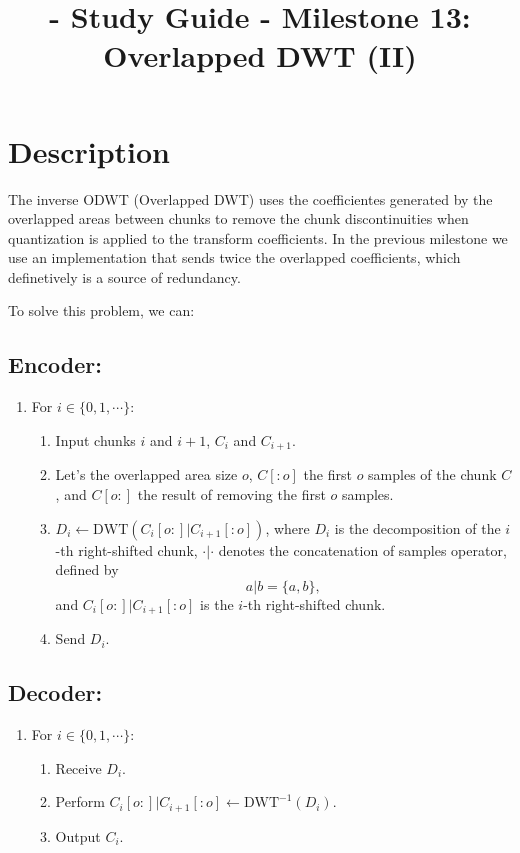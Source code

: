 
\title{\TM{} - Study Guide - Milestone 13: Overlapped DWT (II)}

\maketitle

\section{Description}

The inverse ODWT (Overlapped DWT) uses the coefficientes generated by
the overlapped areas between chunks to remove the chunk
discontinuities when quantization is applied to the transform
coefficients. In the previous milestone we use an implementation that
sends twice the overlapped coefficients, which definetively is a
source of redundancy.

To solve this problem, we can:

\subsection*{Encoder:}
\begin{enumerate}
\item For $i\in\{0,1,\cdots\}$:
  \begin{enumerate}
  \item Input chunks $i$ and $i+1$, $C_i$ and $C_{i+1}$.
  \item Let's the overlapped area size $o$, $C[:o]$ the first $o$
    samples of the chunk $C$, and $C[o:]$ the result of removing the
    first $o$ samples.
  \item $D_i \leftarrow \text{DWT}(C_i[o:]|C_{i+1}[:o])$, where $D_i$ is the
    decomposition of the $i$-th right-shifted chunk, $\cdot|\cdot$ denotes
    the concatenation of samples operator, defined by
    \begin{equation}
      a|b = \{a,b\},
    \end{equation}
    and $C_i[o:]|C_{i+1}[:o]$ is the $i$-th right-shifted chunk.
    \item Send $D_i$.
  \end{enumerate}
\end{enumerate}

\subsection*{Decoder:}
\begin{enumerate}
\item For $i\in\{0,1,\cdots\}$:
  \begin{enumerate}
  \item Receive $D_i$.
  \item Perform $C_i[o:]|C_{i+1}[:o]\leftarrow\text{DWT}^{-1}(D_i)$.
  \item Output $C_i$.
  \end{enumerate}
\end{enumerate}

